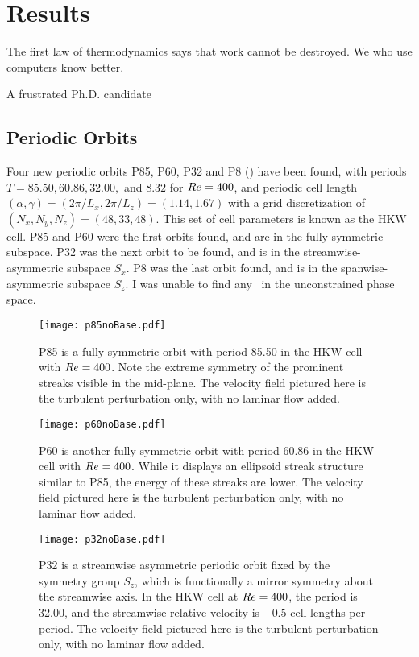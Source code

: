 \chapter{Results}
\epigraph{The first law of thermodynamics says that work cannot be destroyed. We who use computers know better.}{A frustrated Ph.D. candidate}

\section{Periodic Orbits}

Four new periodic orbits P85, P60, P32 and P8 () have been found, with periods $T= 85.50, 60.86, 32.00,$ and $8.32$ for $Re = 400$, and periodic cell length $(\alpha,\gamma) = (2\pi/L_x,2\pi/L_z) = (1.14,1.67)$ with a grid discretization of $(N_x,N_y,N_z) = (48,33,48)$. This  set of cell parameters is known as the HKW cell. P85 and P60 were the first orbits found, and are in the fully symmetric subspace. P32 was the next orbit to be found, and is in the streamwise-asymmetric subspace $S_x$. P8 was the last orbit found, and is in the spanwise-asymmetric subspace $S_z$. I was unable to find any \ecs\ in the unconstrained phase space. 

\begin{figure}
\centerline{\texttt{[image: p85noBase.pdf]}}
\caption{P85 is a fully symmetric orbit with period 85.50 in the HKW cell with $Re=400$. Note the extreme symmetry of the prominent streaks visible in the mid-plane. The velocity field pictured here is the turbulent perturbation only, with no laminar flow added.}\label{fig:p85}
\end{figure}

\begin{figure}
\centerline{\texttt{[image: p60noBase.pdf]}}
\caption{P60 is another fully symmetric orbit with period 60.86 in the HKW cell with $Re = 400$. While it displays an ellipsoid streak structure similar to P85, the energy of these streaks are lower. The velocity field pictured here is the turbulent perturbation only, with no laminar flow added.}\label{fig:p60}
\end{figure}


\begin{figure}
\centerline{\texttt{[image: p32noBase.pdf]}}
\caption{P32 is a streamwise asymmetric periodic orbit fixed by the symmetry group $S_z$, which is functionally a mirror symmetry about the streamwise axis. In the HKW cell at $Re=400$, the period is 32.00, and the streamwise relative velocity is $-0.5$ cell lengths per period. The velocity field pictured here is the turbulent perturbation only, with no laminar flow added.}\label{fig:p32}
\end{figure}


